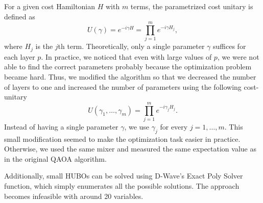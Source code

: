 For a given cost Hamiltonian $H$ with $m$ terms, the parametrized cost unitary is defined as
\begin{equation*}
    U(\gamma) = e^{-i\gamma H} = \prod_{j = 1}^{m}e^{-i\gamma H_j},
\end{equation*}
where $H_j$ is the $j$th term. Theoretically, only a single parameter $\gamma$ suffices for each layer $p$. In practice, we noticed that even with large values of $p$, we were not able to find the correct parameters probably because the optimization problem became hard. Thus, we modified the algorithm so that we decreased the number of layers to one and increased the number of parameters using the following cost-unitary
\begin{equation*}
    U(\gamma_1, \ldots, \gamma_m) = \prod_{j = 1}^{m}e^{-i\gamma_j H_j}.
\end{equation*}
Instead of having a single parameter $\gamma$, we use $\gamma_j$ for every $ j = 1, \ldots, m$. This small modification seemed to make the optimization task easier in practice. Otherwise, we used the same mixer and measured the same expectation value as in the original QAOA algorithm.

Additionally, small HUBOs can be solved using D-Wave's Exact Poly Solver function, which simply enumerates all the possible solutions. The approach becomes infeasible with around 20 variables.